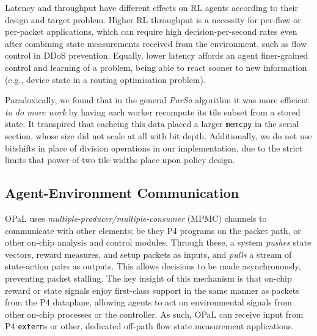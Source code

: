 \documentclass[
conference
,10pt
]{IEEEtran}
\newcommand{\approachshort}{OPaL}
\begin{document}
Latency and throughput have different effects on RL agents according to their design and target problem.
Higher RL throughput is a necessity for per-flow or per-packet applications, which can require high decision-per-second rates even after combining state measurements received from the environment, such as flow control in DDoS prevention.
Equally, lower latency affords an agent finer-grained control and learning of a problem, being able to react sooner to new information (e.g., device state in a routing optimisation problem).

Paradoxically, we found that in the general \emph{ParSa} algorithm it was more efficient \emph{to do more work} by having each worker recompute its tile subset from a stored state.
It transpired that cacheing this data placed a larger \texttt{memcpy} in the serial section, whose size did not scale at all with bit depth.
Additionally, we do not use bitshifts in place of division operations in our implementation, due to the strict limits that power-of-two tile widths place upon policy design.

\subsection{Agent-Environment Communication}\label{sec:agent-environment-communication}
\approachshort{} uses \emph{multiple-producer/multiple-consumer} (MPMC) channels to communicate with other elements; be they P4 programs on the packet path, or other on-chip analysis and control modules.
Through these, a system \emph{pushes} state vectors, reward measures, and setup packets as inputs, and \emph{pulls} a stream of state-action pairs as outputs.
This allows decisions to be made asynchronously, preventing packet stalling.
The key insight of this mechanism is that on-chip reward or state signals enjoy first-class support in the same manner as packets from the P4 dataplane, allowing agents to act on environmental signals from other on-chip processes or the controller.
As such, \approachshort{} can receive input from P4 \texttt{extern}s or other, dedicated off-path flow state measurement applications.
\end{document}
